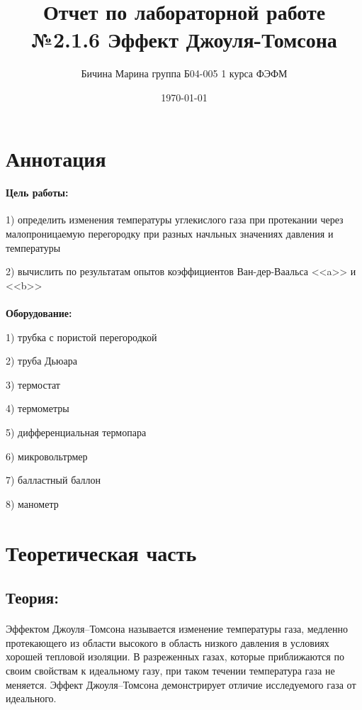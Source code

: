 \documentclass[a4paper,12pt]{article} %
\author{Бичина Марина 
группа Б04-005 1 курса ФЭФМ}
\title{Отчет по лабораторной работе №2.1.6
Эффект Джоуля-Томсона}
\date{\today}
\begin{document}

\maketitle
\newpage


\section{Аннотация}
\paragraph{Цель работы:}
1) определить изменения температуры углекислого газа при протекании через малопроницаемую перегородку при разных начльных значениях давления и температуры

2) вычислить по результатам опытов коэффициентов Ван-дер-Ваальса <<a>> и <<b>> \\ \\ \textbf{Оборудование:}
 
1) трубка с пористой перегородкой

2) труба Дьюара

3) термостат

4) термометры

5) дифференциальная термопара

6) микровольтрмер

7) балластный баллон

8) манометр



\section{Теоретическая часть}
\subsection{Теория:}

\paragraph{}	
Эффектом Джоуля–Томсона называется изменение температуры
газа, медленно протекающего из области высокого в область низкого давления в условиях
хорошей тепловой изоляции.
В разреженных газах,
которые приближаются по своим свойствам
к идеальному газу, при таком течении температура газа не меняется. Эффект Джоуля–Томсона демонстрирует отличие исследуемого газа от идеального.
\end{document}
